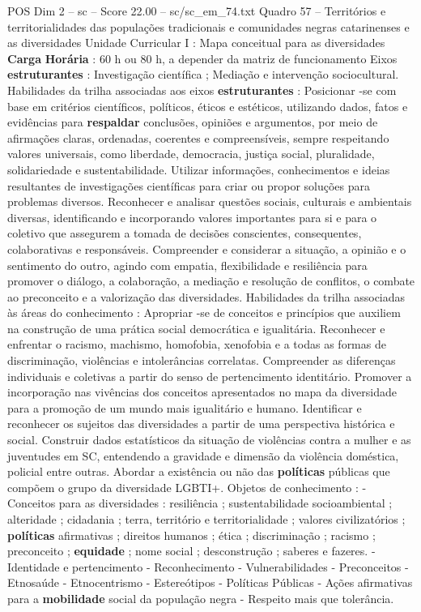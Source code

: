 \begin{textsample}{POS Dim 2 – sc – Score 22.00 – sc/sc\_em\_74.txt}
Quadro 57 – Territórios e territorialidades das populações tradicionais e comunidades negras catarinenses e as diversidades Unidade Curricular I : Mapa conceitual para as diversidades \textbf{Carga} \textbf{Horária} : 60 h ou 80 h, a depender da matriz de funcionamento Eixos \textbf{estruturantes} : Investigação científica ; Mediação e intervenção sociocultural.
Habilidades da trilha associadas aos eixos \textbf{estruturantes} : Posicionar -se com base em critérios científicos, políticos, éticos e estéticos, utilizando dados, fatos e evidências para \textbf{respaldar} conclusões, opiniões e argumentos, por meio de afirmações claras, ordenadas, coerentes e compreensíveis, sempre respeitando valores universais, como liberdade, democracia, justiça social, pluralidade, solidariedade e sustentabilidade.
Utilizar informações, conhecimentos e ideias resultantes de investigações científicas para criar ou propor soluções para problemas diversos.
Reconhecer e analisar questões sociais, culturais e ambientais diversas, identificando e incorporando valores importantes para si e para o coletivo que assegurem a tomada de decisões conscientes, consequentes, colaborativas e responsáveis.
Compreender e considerar a situação, a opinião e o sentimento do outro, agindo com empatia, flexibilidade e resiliência para promover o diálogo, a colaboração, a mediação e resolução de conflitos, o combate ao preconceito e a valorização das diversidades.
Habilidades da trilha associadas às áreas do conhecimento : Apropriar -se de conceitos e princípios que auxiliem na construção de uma prática social democrática e igualitária.
Reconhecer e enfrentar o racismo, machismo, homofobia, xenofobia e a todas as formas de discriminação, violências e intolerâncias correlatas.
Compreender as diferenças individuais e coletivas a partir do senso de pertencimento identitário.
Promover a incorporação nas vivências dos conceitos apresentados no mapa da diversidade para a promoção de um mundo mais igualitário e humano.
Identificar e reconhecer os sujeitos das diversidades a partir de uma perspectiva histórica e social.
Construir dados estatísticos da situação de violências contra a mulher e as juventudes em SC, entendendo a gravidade e dimensão da violência doméstica, policial entre outras.
Abordar a existência ou não das \textbf{políticas} públicas que compõem o grupo da diversidade LGBTI+.
Objetos de conhecimento : - Conceitos para as diversidades : resiliência ; sustentabilidade socioambiental ; alteridade ; cidadania ; terra, território e territorialidade ; valores civilizatórios ; \textbf{políticas} afirmativas ; direitos humanos ; ética ; discriminação ; racismo ; preconceito ; \textbf{equidade} ; nome social ; desconstrução ; saberes e fazeres. - Identidade e pertencimento - Reconhecimento - Vulnerabilidades - Preconceitos - Etnosaúde - Etnocentrismo - Estereótipos - Políticas Públicas - Ações afirmativas para a \textbf{mobilidade} social da população negra - Respeito mais que tolerância.

\end{textsample}
